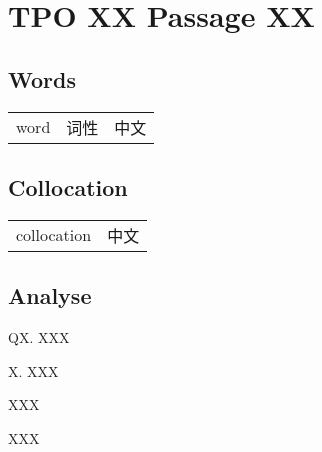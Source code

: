 \section{TPO XX Passage XX}

\subsection{Words}

\begin{tabular}{lll}
    word & 词性 & 中文 \\
\end{tabular}

\subsection{Collocation}

\begin{tabular}{ll}
    collocation & 中文 \\
\end{tabular}

\subsection{Analyse}

\begin{blk}
    \begin{qst}
        QX. XXX
    \end{qst}

    \begin{chc}
        X. XXX
    \end{chc}

    \begin{psgq}
        XXX
    \end{psgq}

    \begin{nlz}
        XXX
    \end{nlz}
\end{blk}
